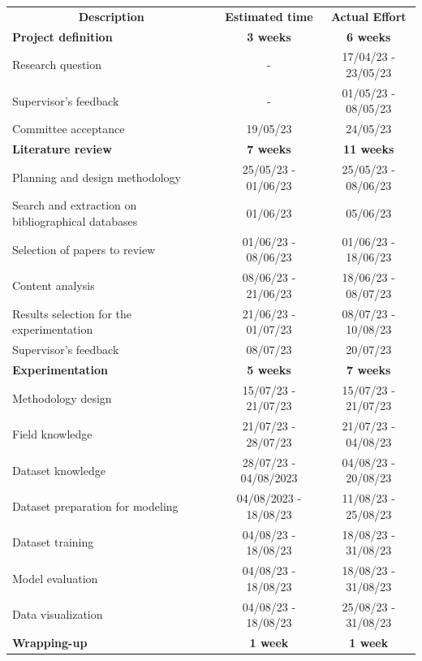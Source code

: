 \documentclass[a4paper,12pt,twoside]{ThesisStyle}
\begin{document}
\renewcommand{\arraystretch}{1.5}
\begin{table}[]
\begin{tabular}{lcc}
\multicolumn{1}{c}{\textbf{Description}} & \textbf{Estimated time} & \textbf{Actual Effort} \\
\rowcolor[HTML]{EBF4E2} 
{\color[HTML]{333333} \textbf{Project definition}} &  {\color[HTML]{333333} \textbf{3 weeks}} & {\color[HTML]{333333} \textbf{6 weeks}} \\
Research question & - & 17/04/23 - 23/05/23  \\
Supervisor's feedback & - & 01/05/23 - 08/05/23  \\
Committee acceptance & 19/05/23 & 24/05/23  \\
\rowcolor[HTML]{E1EED3} 
\textbf{Literature review} & \textbf{7 weeks} & \textbf{11 weeks} \\
\parbox{4.5cm}{Planning and design methodology} &  25/05/23 - 01/06/23 & 25/05/23 - 08/06/23 \\
\parbox{4.5cm}{Search and extraction on bibliographical databases} & 01/06/23 & 05/06/23 \\
\parbox{4cm}{Selection of papers to review} & 01/06/23 - 08/06/23 & 01/06/23 - 18/06/23   \\
Content analysis & 08/06/23 - 21/06/23 & 18/06/23 - 08/07/23  \\
\parbox{4.5cm}{Results selection for the experimentation} & 21/06/23 - 01/07/23  &  08/07/23 - 10/08/23 \\
Supervisor's feedback & 08/07/23 & 20/07/23\\
\textbf{Experimentation} & \textbf{5 weeks} & \textbf{7 weeks} \\
Methodology design & 15/07/23 - 21/07/23 & 15/07/23 - 21/07/23 \\
Field knowledge & 21/07/23 - 28/07/23 & 21/07/23 - 04/08/23 \\
Dataset knowledge & 28/07/23 - 04/08/2023 & 04/08/23 - 20/08/23\\
\parbox{4.5cm}{Dataset preparation for modeling} & 04/08/2023 - 18/08/23 & 11/08/23 - 25/08/23\\
Dataset training & 04/08/23 - 18/08/23 & 18/08/23 - 31/08/23\\
Model evaluation & 04/08/23 - 18/08/23& 18/08/23 - 31/08/23\\
Data visualization & 04/08/23 - 18/08/23 & 25/08/23 - 31/08/23\\
\textbf{Wrapping-up} & \textbf{1 week} & \textbf{1 week} \\

\end{tabular}
\end{table}
\end{document}
